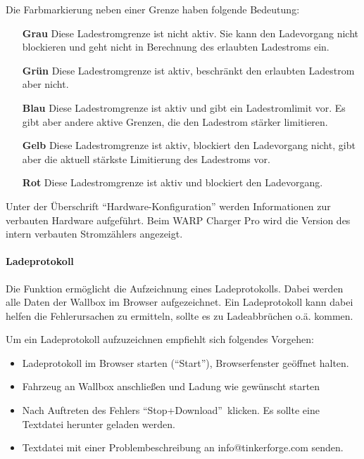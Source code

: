 \documentclass[a4paper,10pt]{article}
\begin{document}
\begin{multicols*}{2}
    Die Farbmarkierung neben einer Grenze haben folgende Bedeutung:
    \begin{itemize}
     \item[\textbf{\textcolor{mygray}{Grau}}] Diese Ladestromgrenze ist nicht aktiv. Sie kann den Ladevorgang nicht blockieren und geht nicht in Berechnung des erlaubten Ladestroms ein.
     \item[\textbf{\textcolor{mygreen}{Grün}}] Diese Ladestromgrenze ist aktiv, beschränkt den erlaubten Ladestrom aber nicht.
     \item[\textbf{\textcolor{myblue}{Blau}}] Diese Ladestromgrenze ist aktiv und gibt ein Ladestromlimit vor. Es gibt aber andere aktive Grenzen, die den Ladestrom stärker limitieren.
     \item[\textbf{\textcolor{myorange}{Gelb}}] Diese Ladestromgrenze ist aktiv, blockiert den Ladevorgang nicht, gibt aber die aktuell stärkste Limitierung des Ladestroms vor.
     \item[\textbf{\textcolor{myred}{Rot}}] Diese Ladestromgrenze ist aktiv und blockiert den Ladevorgang.
    \end{itemize}


    Unter der Überschrift \enquote{Hardware-Konfiguration} werden Informationen
    zur verbauten Hardware aufgeführt. Beim WARP Charger Pro wird die Version
    des intern verbauten Stromzählers angezeigt.

    \paragraph{Ladeprotokoll}
    Die Funktion ermöglicht die Aufzeichnung eines Ladeprotokolls.
    Dabei werden alle Daten der Wallbox im Browser aufgezeichnet. Ein
    Ladeprotokoll kann dabei helfen die Fehlerursachen zu ermitteln, sollte es
    zu Ladeabbrüchen o.ä. kommen.

    Um ein Ladeprotokoll aufzuzeichnen empfiehlt sich folgendes Vorgehen:
    \begin{itemize}
        \item Ladeprotokoll im Browser starten (\enquote{Start}), Browserfenster geöffnet halten.
        \item Fahrzeug an Wallbox anschließen und Ladung wie gewünscht starten
        \item Nach Auftreten des Fehlers \enquote{Stop+Download}~klicken. Es
        sollte eine Textdatei herunter geladen werden.
        \item Textdatei mit einer Problembeschreibung an info@tinkerforge.com
        senden.
    \end{itemize}


\end{multicols*}
\end{document}
